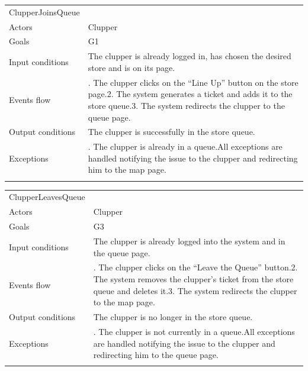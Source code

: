 \documentclass[
]{article}
\begin{document}
\begin{longtable}[]{@{}
  >{\raggedright\arraybackslash}p{}
  >{\raggedright\arraybackslash}p{}@{}}
\toprule
ClupperJoinsQueue & \\ \addlinespace
\midrule
\endhead
Actors & Clupper \\ \addlinespace
Goals & G1 \\ \addlinespace
Input conditions & The clupper is already logged in, has chosen the
desired store and is on its page. \\ \addlinespace
Events flow & 1. The clupper clicks on the ``Line Up'' button on the
store page.2. The system generates a ticket and adds it to the store
queue.3. The system redirects the clupper to the queue
page. \\ \addlinespace
Output conditions & The clupper is successfully in the store
queue. \\ \addlinespace
Exceptions & 1. The clupper is already in a queue.All exceptions are
handled notifying the issue to the clupper and redirecting him to the
map page. \\ \addlinespace
\bottomrule
\end{longtable}

\begin{longtable}[]{@{}
  >{\raggedright\arraybackslash}p{}
  >{\raggedright\arraybackslash}p{}@{}}
\toprule
ClupperLeavesQueue & \\ \addlinespace
\midrule
\endhead
Actors & Clupper \\ \addlinespace
Goals & G3 \\ \addlinespace
Input conditions & The clupper is already logged into the system and in
the queue page. \\ \addlinespace
Events flow & 1. The clupper clicks on the ``Leave the Queue'' button.2.
The system removes the clupper's ticket from the store queue and deletes
it.3. The system redirects the clupper to the map page. \\ \addlinespace
Output conditions & The clupper is no longer in the store
queue. \\ \addlinespace
Exceptions & 1. The clupper is not currently in a queue.All exceptions
are handled notifying the issue to the clupper and redirecting him to
the queue page. \\ \addlinespace
\bottomrule
\end{longtable}
\end{document}
